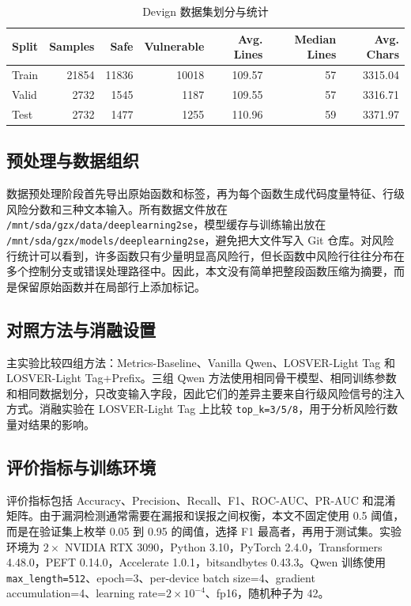 \documentclass[10pt]{article}
\newcommand{\methodname}{LOSVER-Light}
\begin{document}
\begin{table}[H]
\centering
\caption{Devign 数据集划分与统计}
\label{tab:dataset-stats}
\begin{tabular}{lrrrrrr}
\toprule
Split & Samples & Safe & Vulnerable & Avg. Lines & Median Lines & Avg. Chars \\
\midrule
Train & 21854 & 11836 & 10018 & 109.57 & 57 & 3315.04 \\
Valid & 2732 & 1545 & 1187 & 109.55 & 57 & 3316.71 \\
Test & 2732 & 1477 & 1255 & 110.96 & 59 & 3371.97 \\
\bottomrule
\end{tabular}
\end{table}

\subsection{预处理与数据组织}

数据预处理阶段首先导出原始函数和标签，再为每个函数生成代码度量特征、行级风险分数和三种文本输入。所有数据文件放在 \texttt{/mnt/sda/gzx/data/deeplearning2se}，模型缓存与训练输出放在 \texttt{/mnt/sda/gzx/models/deeplearning2se}，避免把大文件写入 Git 仓库。对风险行统计可以看到，许多函数只有少量明显高风险行，但长函数中风险行往往分布在多个控制分支或错误处理路径中。因此，本文没有简单把整段函数压缩为摘要，而是保留原始函数并在局部行上添加标记。

\subsection{对照方法与消融设置}

主实验比较四组方法：Metrics-Baseline、Vanilla Qwen、\methodname{} Tag 和 \methodname{} Tag+Prefix。三组 Qwen 方法使用相同骨干模型、相同训练参数和相同数据划分，只改变输入字段，因此它们的差异主要来自行级风险信号的注入方式。消融实验在 \methodname{} Tag 上比较 \texttt{top\_k=3/5/8}，用于分析风险行数量对结果的影响。

\subsection{评价指标与训练环境}

评价指标包括 Accuracy、Precision、Recall、F1、ROC-AUC、PR-AUC 和混淆矩阵。由于漏洞检测通常需要在漏报和误报之间权衡，本文不固定使用 0.5 阈值，而是在验证集上枚举 0.05 到 0.95 的阈值，选择 F1 最高者，再用于测试集。实验环境为 $2\times$ NVIDIA RTX 3090，Python 3.10，PyTorch 2.4.0，Transformers 4.48.0，PEFT 0.14.0，Accelerate 1.0.1，bitsandbytes 0.43.3。Qwen 训练使用 \texttt{max\_length=512}、epoch=3、per-device batch size=4、gradient accumulation=4、learning rate=$2\times10^{-4}$、fp16，随机种子为 42。
\end{document}
